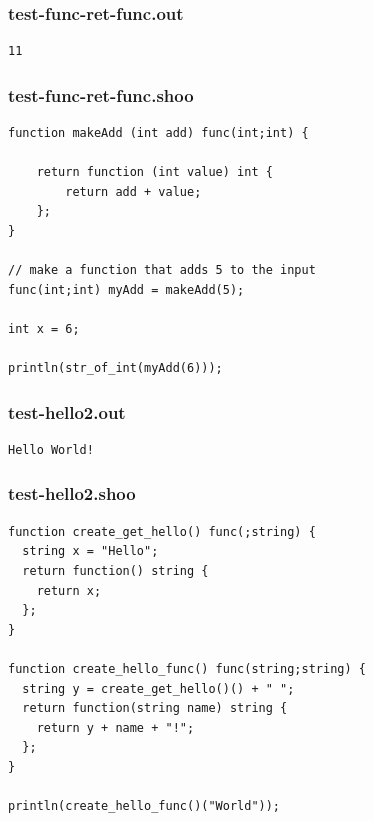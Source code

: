 \documentclass[12pt]{article}
\begin{document}
\subsubsection{test-func-ret-func.out}
\begin{mdframed}[hidealllines=true,backgroundcolor=green!10]
\begin{lstlisting}
11\end{lstlisting}
\end{mdframed}
\subsubsection{test-func-ret-func.shoo}
\begin{mdframed}[hidealllines=true,backgroundcolor=blue!10]
\begin{lstlisting}
function makeAdd (int add) func(int;int) {

	return function (int value) int {
		return add + value;
	};
}

// make a function that adds 5 to the input
func(int;int) myAdd = makeAdd(5);

int x = 6;

println(str_of_int(myAdd(6)));
\end{lstlisting}
\end{mdframed}
\subsubsection{test-hello2.out}
\begin{mdframed}[hidealllines=true,backgroundcolor=green!10]
\begin{lstlisting}
Hello World!
\end{lstlisting}
\end{mdframed}
\subsubsection{test-hello2.shoo}
\begin{mdframed}[hidealllines=true,backgroundcolor=blue!10]
\begin{lstlisting}
function create_get_hello() func(;string) {
  string x = "Hello";
  return function() string {
    return x;
  };
}

function create_hello_func() func(string;string) {
  string y = create_get_hello()() + " ";
  return function(string name) string {
    return y + name + "!";
  };
}

println(create_hello_func()("World"));\end{lstlisting}
\end{mdframed}
\end{document}
